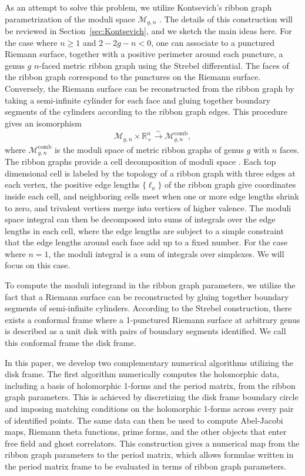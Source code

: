 \documentclass[12pt]{article}
\def\ie{\begin{equation}\begin{aligned}}
\def\fe{\end{aligned}\end{equation}}
\numberwithin{equation}{section}
\begin{document}
As an attempt to solve this problem, we utilize Kontsevich's ribbon graph parametrization of the moduli space $\mathcal{M}_{g,n}$ \cite{Kontsevich:1992ti}. The details of this construction will be reviewed in Section~\ref{sec:Kontsevich}, and we sketch the main ideas here. For the case where $n\geq 1$ and $2-2g-n<0$, one can associate to a punctured Riemann surface, together with a positive perimeter around each puncture, a genus $g$ $n$-faced metric ribbon graph using the Strebel differential\cite{Strebel:1967,Strebel:1984}. The faces of the ribbon graph correspond to the punctures on the Riemann surface. Conversely, the Riemann surface can be reconstructed from the ribbon graph by taking a semi-infinite cylinder for each face and gluing together boundary segments of the cylinders according to the ribbon graph edges. This procedure gives an isomorphism
\ie
\mathcal{M}_{g,n}\times \mathbb{R}_+^n \xrightarrow{\sim} \mathcal{M}_{g,n}^{\text{comb}},
\fe
where $\mathcal{M}_{g,n}^{\text{comb}}$ is the moduli space of metric ribbon graphs of genus $g$ with $n$ faces. The ribbon graphs provide a cell decomposition of moduli space \cite{Penner}. Each top dimensional cell is labeled by the topology of a ribbon graph with three edges at each vertex, the positive edge lengths $\{\ell_a\}$ of the ribbon graph give coordinates inside each cell, and neighboring cells meet when one or more edge lengths shrink to zero, and trivalent vertices merge into vertices of higher valence. The moduli space integral can then be decomposed into sums of integrals over the edge lengths in each cell, where the edge lengths are subject to a simple constraint that the edge lengths around each face add up to a fixed number. For the case where $n=1$, the moduli integral is a sum of integrals over simplexes. We will focus on this case.

To compute the moduli integrand in the ribbon graph parameters, we utilize the fact that a Riemann surface can be reconstructed by gluing together boundary segments of semi-infinite cylinders. According to the Strebel construction, there exists a conformal frame where a 1-punctured Riemann surface at arbitrary genus is described as a unit disk with pairs of boundary segments identified. We call this conformal frame the disk frame.

In this paper, we develop two complementary numerical algorithms utilizing the disk frame. The first algorithm numerically computes the holomorphic data, including a basis of holomorphic 1-forms and the period matrix, from the ribbon graph parameters. This is achieved by discretizing the disk frame boundary circle and imposing matching conditions on the holomorphic 1-forms across every pair of identified points. The same data can then be used to compute Abel-Jacobi maps, Riemann theta functions, prime forms, and the other objects that enter free field and ghost correlators. This construction gives a numerical map from the ribbon graph parameters to the period matrix, which allows formulae written in the period matrix frame to be evaluated in terms of ribbon graph parameters.
\end{document}
